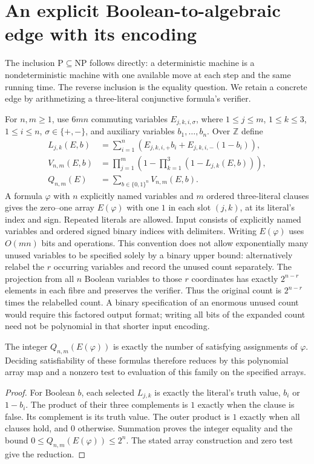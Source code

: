 \section{An explicit Boolean-to-algebraic edge with its encoding}
\label{sec:boolean}
The inclusion $\mathrm P\subseteq\mathrm{NP}$ follows directly:
a deterministic machine is a nondeterministic machine with one
available move at each step and the same running time.
The reverse inclusion is the equality question.
We retain a concrete edge by arithmetizing a three-literal conjunctive
formula's verifier.

For $n,m\ge1$, use $6mn$ commuting variables $E_{j,k,i,\sigma}$,
where $1\le j\le m$, $1\le k\le3$, $1\le i\le n$,
$\sigma\in\{+,-\}$, and auxiliary variables $b_1,\ldots,b_n$.
Over $\mathbb Z$ define
\begin{align*}
 L_{j,k}(E,b)&=\sum_{i=1}^n
   (E_{j,k,i,+}b_i+E_{j,k,i,-}(1-b_i)),\\
 V_{n,m}(E,b)&=\prod_{j=1}^m
   \left(1-\prod_{k=1}^3(1-L_{j,k}(E,b))\right),\\
 Q_{n,m}(E)&=\sum_{b\in\{0,1\}^n}V_{n,m}(E,b).
\end{align*}
A formula $\varphi$ with $n$ explicitly named variables and $m$
ordered three-literal clauses gives the zero--one array $E(\varphi)$
with one $1$ in each slot $(j,k)$, at its literal's index and sign.
Repeated literals are allowed. Input consists of explicitly named
variables and ordered signed binary indices with delimiters.
Writing $E(\varphi)$ uses $O(mn)$ bits and operations.
This convention does not allow exponentially many unused variables
to be specified solely by a binary upper bound: alternatively relabel
the $r$ occurring variables and record the unused count separately.
The projection from all $n$ Boolean variables to those $r$ coordinates
has exactly $2^{n-r}$ elements in each fibre and preserves the verifier.
Thus the original count is $2^{n-r}$ times the relabelled count.
A binary specification of an enormous unused count would require this
factored output format; writing all bits of the expanded count need
not be polynomial in that shorter input encoding.

\begin{proposition}\label{prop:counting}
The integer $Q_{n,m}(E(\varphi))$ is exactly the number of satisfying
assignments of $\varphi$. Deciding satisfiability of these formulas
therefore reduces by this polynomial array map and a nonzero test
to evaluation of this family on the specified arrays.
\end{proposition}
\begin{proof}
For Boolean $b$, each selected $L_{j,k}$ is exactly the literal's
truth value, $b_i$ or $1-b_i$.
The product of their three complements is $1$ exactly when the
clause is false. Its complement is its truth value.
The outer product is $1$ exactly when all clauses hold, and $0$
otherwise. Summation proves the integer equality and the bound
$0\le Q_{n,m}(E(\varphi))\le2^n$.
The stated array construction and zero test give the reduction.
\end{proof}

